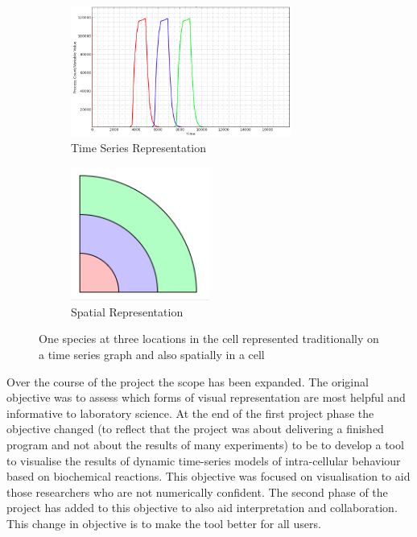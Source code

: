 \begin{figure}[h!]
    \centering
    \begin{subfigure}[b]{0.4\textwidth}
        \centering
        \includegraphics[width=0.8\textwidth]{images/asrc_graph_intro.png}
        \caption{Time Series Representation}
        \label{fig:asrc_graph_intro}
    \end{subfigure}
    \begin{subfigure}[b]{0.4\textwidth}
        \centering
        \includegraphics[width=0.5\textwidth]{images/asrc_cell_intro.png}
        \caption{Spatial Representation}
        \label{fig:asrc_cell_intro}
    \end{subfigure}
    \caption{One species at three locations in the cell represented traditionally on a time series graph and also spatially in a cell}
    \label{fig:asrc_intro}
\end{figure}


Over the course of the project the scope has been expanded.  The original objective was to assess which forms of visual representation are most helpful and informative to laboratory science.  At the end of the first project phase the objective changed (to reflect that the project was about delivering a finished program and not about the results of many experiments) to be to develop a tool to visualise the results of dynamic time-series models of intra-cellular behaviour based on biochemical reactions.  This objective was focused on visualisation to aid those researchers who are not numerically confident.  The second phase of the project has added to this objective to also aid interpretation and collaboration.  This change in objective is to make the tool better for all users.

